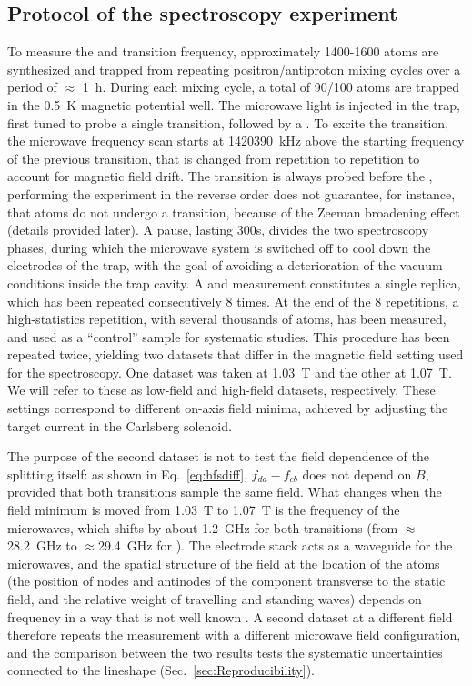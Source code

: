 \subsection{Protocol of the spectroscopy experiment} \label{Protocol-of-experiment}
To measure the \fcb and \fda transition frequency, approximately 1400-1600 atoms are synthesized and trapped from repeating positron/antiproton mixing cycles over a period of $\approx$ \SI{1}{\hour}. During each mixing cycle, a total of 90/100 atoms are trapped in the \SI{0.5}{\kelvin} magnetic potential well. The microwave light is injected in the trap, first tuned to probe a single \cb transition, followed by a \da. To excite the \da transition, the microwave frequency scan starts at \SI{+1420390}{\kilo \hertz} above the starting frequency of the previous \cb transition, that is changed from repetition to repetition to account for magnetic field drift. The \cb transition is always probed before the \da , performing the experiment in the reverse order does not guarantee, for instance, that \cstate atoms do not undergo a transition, because of the Zeeman broadening effect (details provided later).
A pause, lasting 300s, divides the two spectroscopy phases, during which the microwave system is switched off to cool down the electrodes of the trap, with the goal of avoiding a deterioration of the vacuum conditions inside the trap cavity. A \fcb and \fda measurement constitutes a single replica, which has been repeated consecutively 8 times. At the end of the 8 repetitions, a high-statistics repetition, with several thousands of atoms, has been measured, and used as a ``control'' sample for systematic studies. This procedure has been repeated twice, yielding two datasets that differ in the magnetic field setting used for the spectroscopy. One dataset was taken at \SI{1.03}{\tesla} and the other at \SI{1.07}{\tesla}. We will refer to these as low-field and high-field datasets, respectively. These settings correspond to different on-axis field minima, achieved by adjusting the target current in the Carlsberg solenoid.

The purpose of the second dataset is not to test the field dependence of the splitting itself: as shown in Eq.~\ref{eq:hfsdiff}, $f_{da}-f_{cb}$ does not depend on $B$, provided that both transitions sample the same field. What changes when the field minimum is moved from \SI{1.03}{\tesla} to \SI{1.07}{\tesla} is the frequency of the microwaves, which shifts by about \SI{1.2}{\giga\hertz} for both transitions (from $\approx$\SI{28.2}{\giga\hertz} to $\approx$\SI{29.4}{\giga\hertz} for \cb). The electrode stack acts as a waveguide for the microwaves, and the spatial structure of the field at the location of the atoms (the position of nodes and antinodes of the component transverse to the static field, and the relative weight of travelling and standing waves) depends on frequency in a way that is not well known \cite{ALPHA:2026lbu}. A second dataset at a different field therefore repeats the measurement with a different microwave field configuration, and the comparison between the two results tests the systematic uncertainties connected to the lineshape (Sec.~\ref{sec:Reproducibility}).

